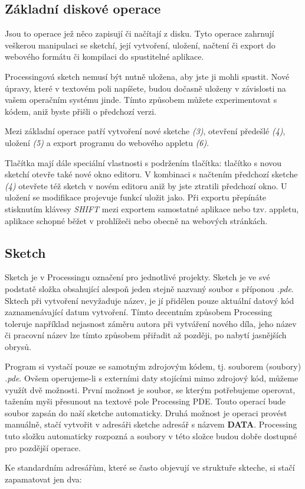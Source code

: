 \documentclass[10pt]{book}
\newcommand{\pododdil}[1]{\subsection{#1}\index{#1}\label{#1}}
\newcommand{\klavesy}[1]{\textsc{\em #1}}
\newcommand{\slovnik}[1]{\textbf{\gls{#1}}\index{#1}\label{#1}}
\begin{document}
\pododdil{Základní diskové operace}

Jsou to operace jež něco zapisují či načítají z disku. Tyto operace zahrnují veškerou manipulaci se sketchí, její vytvoření, uložení, načtení či export do webového formátu či kompilaci do spustitelné aplikace.

Processingová sketch nemusí být nutně uložena, aby jste ji mohli spustit. Nové úpravy, které v textovém poli napíšete, budou dočasně uloženy v závislosti na vašem operačním systému jinde. Tímto způsobem můžete experimentovat s kódem, aniž byste přišli o předchozí verzi.

Mezi základní operace patří vytvoření nové sketche {\em (3)}, otevření předešlé {\em (4)}, uložení {\em (5)} a export programu do webového appletu {\em (6)}.

Tlačítka mají dále speciální vlastnosti s podržením tlačítka: tlačítko s novou sketchí otevře také nové okno editoru. V kombinaci s načtením předchozí sketche {\em (4)} otevřete též sketch v novém editoru aniž by jste ztratili předchozí okno. U uložení se modifikace projevuje funkcí uložit jako. Při exportu přepínáte stisknutím klávesy \klavesy{SHIFT} mezi exportem samostatné aplikace nebo tzv. appletu, aplikace schopné běžet v prohlížeči nebo obecně na webových stránkách. 


\pododdil{Sketch}

Sketch je v Processingu označení pro jednotlivé projekty. Sketch je ve své podstatě složka obsahující alespoň jeden stejně nazvaný soubor s příponou {\em *.pde}. Sktech při vytvoření nevyžaduje název, je jí přidělen pouze aktuální datový kód zaznamenávající datum vytvoření. Tímto decentním způsobem Processing toleruje například nejasnost záměru autora při vytváření nového díla, jeho název či pracovní název lze tímto způsobem přiřadit až později, po nabytí jasnějších obrysů.

Program si vystačí pouze se samotným zdrojovým kódem, tj. souborem (soubory) {\em *.pde}. Ovšem operujeme-li s externími daty stojícími mimo zdrojový kód, můžeme využít dvě možnosti. První možnost je soubor, se kterým potřebujeme operovat, tažením myši přesunout na textové pole Processing PDE. Touto operací bude soubor zapsán do naší sketche automaticky. Druhá možnost je operaci provést manuálně, stačí vytvořit v adresáři sketche adresář s názvem \slovnik{DATA}. Processing tuto složku automaticky rozpozná a soubory v této složce budou dobře dostupné pro pozdější operace.

Ke standardním adresářům, které se často objevují ve struktuře skteche, si stačí zapamatovat jen dva:
\end{document}
